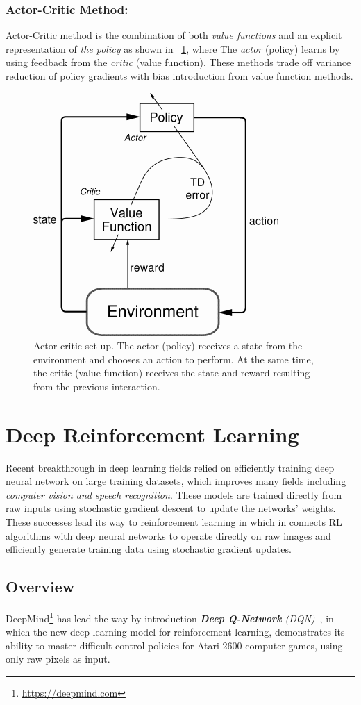 \subsubsection{Actor-Critic Method:}
Actor-Critic method is the combination of both \textit{value functions} and an explicit representation of \textit{the policy} as shown in ~\ref{fig:actor_critic}, where The \textit{actor} (policy) learns by using feedback from the \textit{critic} (value function).
These methods trade off variance reduction of policy gradients with bias introduction from value function methods.

\begin{figure}[H]
		\begin{center}
				\includegraphics[width=.3\linewidth]{figures/actor_critic.png}
				\caption{Actor-critic set-up. The actor (policy) receives a state from the environment and chooses an action to perform. At the same time, the critic (value function) receives the state and reward resulting from the previous interaction.~\parencite{arulkumaran2017brief}}
				\label{fig:actor_critic}
		\end{center}
\end{figure}



\section{Deep Reinforcement Learning}

Recent breakthrough in deep learning fields relied on efficiently training deep neural network on large training datasets, which improves many fields including \textit{computer vision and speech recognition}. These models are trained directly from raw inputs using stochastic gradient descent to update the networks' weights. These successes lead its way to reinforcement learning in which in connects RL algorithms with deep neural networks to operate directly on raw images and efficiently generate training data using stochastic gradient updates.

\subsection{Overview}
DeepMind\footnote{\url{https://deepmind.com}\label{deepmind}} has lead the way by introduction \textit{\textbf{Deep Q-Network} (DQN)}~\parencite{mnih2015human}, in which the new deep learning model for reinforcement learning, demonstrates its ability to master difficult control policies for Atari 2600 computer games, using only raw pixels as input.\\


